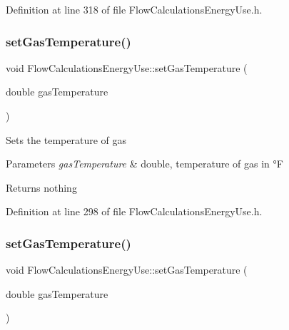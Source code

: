 Definition at line 318 of file Flow\+Calculations\+Energy\+Use.\+h.

\mbox{\label{class_flow_calculations_energy_use_a80db5465d8a0354da31a7f90c759ea1f}} 
\subsubsection{\texorpdfstring{set\+Gas\+Temperature()}{setGasTemperature()}\hspace{0.1cm}{\footnotesize\ttfamily [1/3]}}
{\footnotesize\ttfamily void Flow\+Calculations\+Energy\+Use\+::set\+Gas\+Temperature (\begin{DoxyParamCaption}\item[{double}]{gas\+Temperature }\end{DoxyParamCaption})\hspace{0.3cm}{\ttfamily [inline]}}

Sets the temperature of gas


\begin{DoxyParams}{Parameters}
{\em gas\+Temperature} & double, temperature of gas in °F\\
\hline
\end{DoxyParams}
\begin{DoxyReturn}{Returns}
nothing 
\end{DoxyReturn}


Definition at line 298 of file Flow\+Calculations\+Energy\+Use.\+h.

\mbox{\label{class_flow_calculations_energy_use_a80db5465d8a0354da31a7f90c759ea1f}} 
\subsubsection{\texorpdfstring{set\+Gas\+Temperature()}{setGasTemperature()}\hspace{0.1cm}{\footnotesize\ttfamily [2/3]}}
{\footnotesize\ttfamily void Flow\+Calculations\+Energy\+Use\+::set\+Gas\+Temperature (\begin{DoxyParamCaption}\item[{double}]{gas\+Temperature }\end{DoxyParamCaption})\hspace{0.3cm}{\ttfamily [inline]}}

